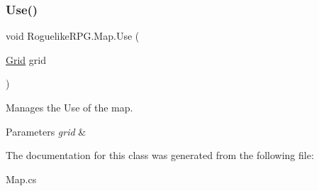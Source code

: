 \subsubsection{\texorpdfstring{Use()}{Use()}}
{\footnotesize\ttfamily void Roguelike\+R\+P\+G.\+Map.\+Use (\begin{DoxyParamCaption}\item[{\mbox{\hyperlink{class_roguelike_r_p_g_1_1_grid}{Grid}}}]{grid }\end{DoxyParamCaption})\hspace{0.3cm}{\ttfamily [inline]}}



Manages the Use of the map. 


\begin{DoxyParams}{Parameters}
{\em grid} & \\
\hline
\end{DoxyParams}


The documentation for this class was generated from the following file\+:\begin{DoxyCompactItemize}
\item 
Map.\+cs\end{DoxyCompactItemize}
